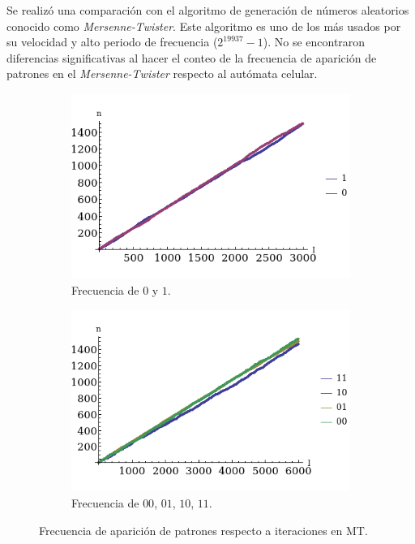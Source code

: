 \documentclass[letterpaper,11pt]{article}
\begin{document}
Se realizó una comparación con el algoritmo de generación de números aleatorios conocido como \textit{Mersenne-Twister}. Este algoritmo es uno de los más usados por su velocidad y alto periodo de frecuencia ($2^{19937}-1$). No se encontraron diferencias significativas al hacer el conteo de la frecuencia de aparición de patrones en el \textit{Mersenne-Twister} respecto al autómata celular.

\begin{figure}[h!]
\begin{subfigure}{.5\textwidth}
	\centering
	\includegraphics[scale=0.55]{img/Mersenne_Grupo1}
	\caption{Frecuencia de $0$ y $1$.}
\end{subfigure}%
\begin{subfigure}{.5\textwidth}
	\centering
	\includegraphics[scale=0.55]{img/Mersenne_Grupo2}
	\caption{Frecuencia de $00$, $01$, $10$, $11$.}
\end{subfigure}%
\caption{Frecuencia de aparición de patrones respecto a iteraciones en MT.}
\label{fig:acpat1}
\end{figure}
\end{document}
